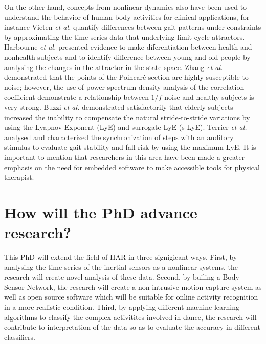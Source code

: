 \documentclass{sigchi}
\begin{document}
On the other hand, concepts from nonlinear dynamics also have been used to understand 
the behavior of human body activities for clinical applications, for instance
Vieten \emph{et al.} \cite{Vieten2013} quantify differences between gait patterns 
under constraints by approximating the time series data that underlying limit cycle 
attractors. 
Harbourne \emph{et al.} \cite{Harbourne2009} presented evidence 
to make diferentiation between health and nonhealth subjects and 
to identify difference between young and old people 
by analysing the changes in the attractor in the state space.
Zhang \textit{et al.} \cite{Zhang2010} demonstrated that the points of the 
Poincar\'e section are highly susceptible to noise; however, the use of power 
spectrum density analysis of the correlation coefficient demonstrate a relationship 
between $1/f$ noise and healthy subjects is very strong.
Buzzi \textit{et al.} \cite{Buzzi2003} demonstrated satisfactorily that elderly 
subjects increased the inability to compensate the natural stride-to-stride variations
by using the Lyapnov Exponent (LyE) and surrogate LyE (s-LyE).
Terrier \textit{et al.} \cite{Terrier2013} analysed and characterized the 
synchronization of steps with an auditory stimulus to evaluate gait stability 
and fall risk by using the maximum LyE.
It is important to mention that researchers in this area have been made 
a greater emphasis on the need for embedded software to make accessible 
tools for physical therapist.

\section{How will the PhD advance research?}

This PhD will extend the field of HAR in three signigicant ways.
First, by analysing the time-series of the inertial sensors as a nonlinear systems, 
the research will create novel analysis of these data.
Second, by builing a Body Sensor Network, the research will create a non-intrusive motion 
capture system as well as open source software which will be suitable for online activity 
recognition in a more realistic condition. 
Third, by applying different machine learning algorithms to classify the complex activitites 
involved in dance, the research will contribute to interpretation of the data so as
to evaluate the accuracy in different classifiers.
\end{document}
